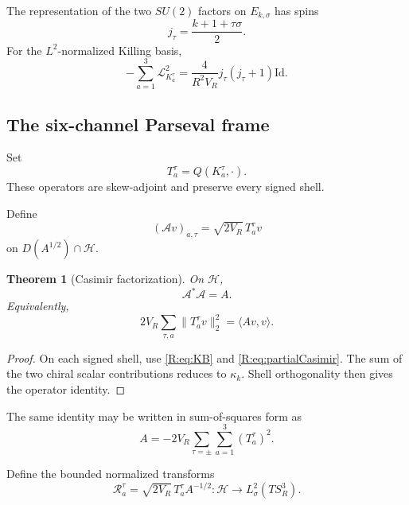 \documentclass[
 aps,
 prd,
 reprint,
 amsmath,
 amssymb,
 nofootinbib,
 superscriptaddress
]{revtex4-2}
\newtheorem{theorem}{Theorem}[section]
\theoremstyle{definition}
\theoremstyle{remark}
\newcommand{\Sthree}{S^3_R}
\newcommand{\cA}{\mathscr A}
\newcommand{\cR}{\mathscr R}
\newcommand{\Id}{\mathrm{Id}}
\begin{document}
The representation of the two $SU(2)$ factors on $E_{k,\sigma}$ has spins
\begin{equation}
       j_\tau=\frac{k+1+\tau\sigma}{2}.
       \label{R:eq:spin}
\end{equation}
For the $L^2$-normalized Killing basis,
\begin{equation}
 -\sum_{a=1}^3\mathcal L_{K_a^\tau}^2
 =
 \frac{4}{R^2V_R}j_\tau(j_\tau+1)\Id.
 \label{R:eq:partialCasimir}
\end{equation}

\subsection{The six-channel Parseval frame}

Set
\[
       T_a^\tau=Q(K_a^\tau,\cdot).
\]
These operators are skew-adjoint and preserve every signed shell.

Define
\[
 (\cA v)_{a,\tau}
 =
 \sqrt{2V_R}\,T_a^\tau v
\]
on $D(A^{1/2})\cap\mathcal H$.

\begin{theorem}[Casimir factorization]
\label{R:thm:factor}
On $\mathcal H$,
\begin{equation}
 \boxed{\cA^*\cA=A.}
 \label{R:eq:factor}
\end{equation}
Equivalently,
\begin{equation}
 \boxed{
 2V_R\sum_{\tau,a}\|T_a^\tau v\|_2^2
 =
 \langle Av,v\rangle.
 }
 \label{R:eq:diss}
\end{equation}
\end{theorem}

\begin{proof}
On each signed shell, use \eqref{R:eq:KB} and
\eqref{R:eq:partialCasimir}.  The sum of the two chiral scalar contributions
reduces to $\kappa_k$.  Shell orthogonality then gives the operator identity.
\end{proof}


The same identity may be written in sum-of-squares form as
\begin{equation}
 \boxed{
 A
 =
 -2V_R
 \sum_{\tau=\pm}\sum_{a=1}^3
 (T_a^\tau)^2.
 }
 \label{R:eq:CasimirCore}
\end{equation}

Define the bounded normalized transforms
\begin{equation}
 \boxed{
 \cR_a^\tau
 =
 \sqrt{2V_R}\,T_a^\tau A^{-1/2}
 :
 \mathcal H\to L^2_\sigma(T\Sthree).
 }
 \label{R:eq:R}
\end{equation}
\end{document}
